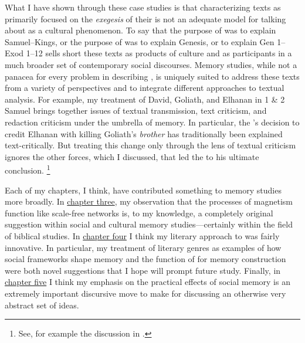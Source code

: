 What I have shown through these case studies is that characterizing \rwb texts as primarily focused on the \emph{exegesis} of their \vorlagen is not an adequate model for talking about \rwb as a cultural phenomenon. To say that the purpose of \chronicles was to explain Samuel--Kings, or the purpose of \ga was to explain Genesis, or \jub to explain Gen 1--Exod 1--12 sells short these texts as products of culture and as participants in a much broader set of contemporary social discourses. Memory studies, while not a panacea for every problem in describing \rwb, is uniquely suited to address these texts from a variety of perspectives and to integrate different approaches to textual analysis. For example, my treatment of David, Goliath, and Elhanan in 1 \& 2 Samuel brings together issues of textual transmission, text criticism, and redaction criticism under the umbrella of memory. In particular, the \chronicler's decision to credit Elhanan with killing Goliath's \emph{brother} has traditionally been explained text-critically. But treating this change only through the lens of textual criticism ignores the other forces, which I discussed, that led the \chronicler to his ultimate conclusion.%
    \footnote{See, for example the discussion in \cite[368--369]{japhet1993}.}

Each of my chapters, I think, have contributed something to memory studies more broadly. In \hyperref[chap:chronicles]{chapter three}, my observation that the processes of magnetism function like scale-free networks is, to my knowledge, a completely original suggestion within social and cultural memory studies---certainly within the field of biblical studies. In \hyperref[chap:ga]{chapter four} I think my literary approach to \ga was fairly innovative. In particular, my treatment of literary genres as examples of how social frameworks shape memory and the function of \psy for memory construction were both novel suggestions that I hope will prompt future study. Finally, in \hyperref[chap:jubilees]{chapter five} I think my emphasis on the practical effects of social memory is an extremely important discursive move to make for discussing an otherwise very abstract set of ideas. 

